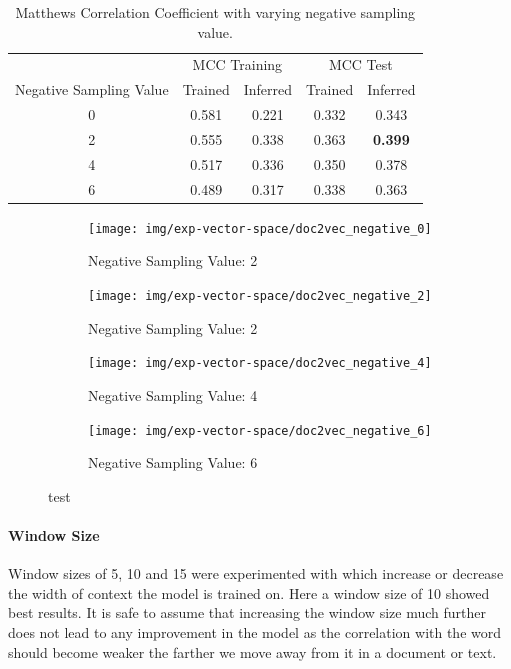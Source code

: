 \begin{table}[h]
  \begin{center}
    \begin{tabular}{ c | *2c | *2c }
      \toprule
       & \multicolumn{2}{c|}{MCC Training} & \multicolumn{2}{|c}{MCC Test}\\
      Negative Sampling Value & Trained & Inferred & Trained & Inferred \\
      \midrule
      0 & 0.581 & 0.221 & 0.332 & 0.343 \\
      2 & 0.555 & 0.338 & 0.363 & \textbf{0.399} \\
      4 & 0.517 & 0.336 & 0.350 & 0.378 \\
      6 & 0.489 & 0.317 & 0.338 & 0.363 \\
    \bottomrule
  \end{tabular}
  \caption{Matthews Correlation Coefficient with varying negative sampling value.}
\label{tab:Paragraph Vector Parameter Results Negative Sampling}
\end{center}

\end{table}

\begin{figure}[h!]
    \centering
    \begin{subfigure}[b]{0.49\textwidth}
      \texttt{[image: img/exp-vector-space/doc2vec\_negative\_0]}
      \caption{Negative Sampling Value: 2}
\label{fig:doc2vec_negative_0}
    \end{subfigure}
    \begin{subfigure}[b]{0.49\textwidth}
      \texttt{[image: img/exp-vector-space/doc2vec\_negative\_2]}
    \caption{Negative Sampling Value: 2}
\label{fig:doc2vec_vector_size_2}
    \end{subfigure}
    \begin{subfigure}[b]{0.49\textwidth}
      \texttt{[image: img/exp-vector-space/doc2vec\_negative\_4]}
      \caption{Negative Sampling Value: 4}
\label{fig:doc2vec_vector_size_4}
  \end{subfigure}
  \begin{subfigure}[b]{0.49\textwidth}
    \texttt{[image: img/exp-vector-space/doc2vec\_negative\_6]}
    \caption{Negative Sampling Value: 6}
\label{fig:doc2vec_negative_6}
  \end{subfigure}
\caption{test}
\label{fig:doc2vec_negative}
\end{figure}

\paragraph{Window Size}
Window sizes of 5, 10 and 15 were experimented with which increase or decrease the width of context the model is trained on. Here a window size of 10 showed best results. It is safe to assume that increasing the window size much further does not lead to any improvement in the model as the correlation with the word should become weaker the farther we move away from it in a document or text.

